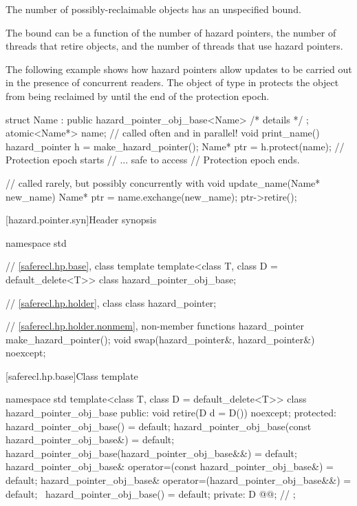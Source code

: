 \pnum
The number of possibly-reclaimable objects has an unspecified bound.
\begin{note}
The bound can be a function of the number of hazard pointers,
the number of threads that retire objects, and
the number of threads that use hazard pointers.
\end{note}
\begin{example}
The following example shows how hazard pointers allow updates to be carried out
in the presence of concurrent readers.
The object of type  in 
protects the object  from being reclaimed by 
until the end of the protection epoch.
\begin{codeblock}
struct Name : public hazard_pointer_obj_base<Name> { /* details */ };
atomic<Name*> name;
// called often and in parallel!
void print_name() {
  hazard_pointer h = make_hazard_pointer();
  Name* ptr = h.protect(name);          // Protection epoch starts
  // ... safe to access 
}                                       // Protection epoch ends.

// called rarely, but possibly concurrently with 
void update_name(Name* new_name) {
  Name* ptr = name.exchange(new_name);
  ptr->retire();
}
\end{codeblock}
\end{example}

[hazard.pointer.syn]{Header  synopsis}

%
\begin{codeblock}
namespace std {
  // \ref{saferecl.hp.base}, class template 
  template<class T, class D = default_delete<T>> class hazard_pointer_obj_base;

  // \ref{saferecl.hp.holder}, class 
  class hazard_pointer;

  // \ref{saferecl.hp.holder.nonmem}, non-member functions
  hazard_pointer make_hazard_pointer();
  void swap(hazard_pointer&, hazard_pointer&) noexcept;
}
\end{codeblock}

[saferecl.hp.base]{Class template }

\begin{codeblock}
namespace std {
  template<class T, class D = default_delete<T>>
  class hazard_pointer_obj_base {
  public:
    void retire(D d = D()) noexcept;
  protected:
    hazard_pointer_obj_base() = default;
    hazard_pointer_obj_base(const hazard_pointer_obj_base&) = default;
    hazard_pointer_obj_base(hazard_pointer_obj_base&&) = default;
    hazard_pointer_obj_base& operator=(const hazard_pointer_obj_base&) = default;
    hazard_pointer_obj_base& operator=(hazard_pointer_obj_base&&) = default;
    ~hazard_pointer_obj_base() = default;
  private:
    D @@;      // \expos
  };
}
\end{codeblock}

